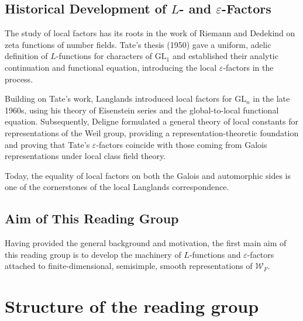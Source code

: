 \documentclass[11pt]{amsart}
\begin{document}
 
\bigskip

\subsection{Historical Development of $L$- and $\varepsilon$-Factors}

The study of local factors has its roots in the work of Riemann and 
Dedekind on zeta functions of number fields. 
Tate's thesis (1950) gave a uniform, adelic definition of $L$-functions 
for characters of $\mathrm{GL}_1$ and established their analytic continuation 
and functional equation, introducing the local $\varepsilon$-factors in the process.

Building on Tate’s work, Langlands introduced local factors for 
$\mathrm{GL}_n$ in the late 1960s, using his theory of Eisenstein series 
and the global-to-local functional equation. 
Subsequently, Deligne formulated a general theory of local constants 
for representations of the Weil group, providing a representation-theoretic 
foundation and proving that Tate’s $\varepsilon$-factors coincide with those 
coming from Galois representations under local class field theory.

Today, the equality of local factors on both the Galois and automorphic sides 
is one of the cornerstones of the local Langlands correspondence.



\bigskip


\subsection{Aim of This Reading Group}

Having provided the general background and motivation, 
the first main aim of this reading group is to develop the 
machinery of $L$-functions and $\varepsilon$-factors attached to 
finite-dimensional, semisimple, smooth representations of 
\(\mathcal{W}_F\).

\section{Structure of the reading group}
\end{document}
